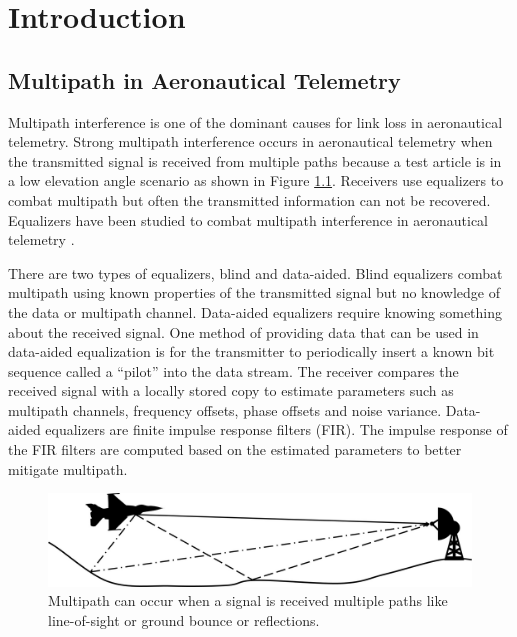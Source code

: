 \chapter{Introduction}
\section{Multipath in Aeronautical Telemetry}
Multipath interference is one of the dominant causes for link loss in aeronautical telemetry.
Strong multipath interference occurs in aeronautical telemetry when the transmitted signal is received from multiple paths because a test article is in a low elevation angle scenario as shown in Figure \ref{fig:multipath}.
Receivers use equalizers to combat multipath but often the transmitted information can not be recovered.
Equalizers have been studied to combat multipath interference in aeronautical telemetry \cite{rice-afran-saquib:2014,rice-afran-saquib-cole-rhodes-moazzami:2014}.

There are two types of equalizers, blind and data-aided.
Blind equalizers combat multipath using known properties of the transmitted signal but no knowledge of the data or multipath channel.
Data-aided equalizers require knowing something about the received signal.
One method of providing data that can be used in data-aided equalization is for the transmitter to periodically insert a known bit sequence called a ``pilot'' into the data stream.
The receiver compares the received signal with a locally stored copy to estimate parameters such as multipath channels, frequency offsets, phase offsets and noise variance.
Data-aided equalizers are finite impulse response filters (FIR). The impulse response of the FIR filters are computed based on the estimated parameters to better mitigate multipath.
\begin{figure}
	\centering\includegraphics[width=12.11in/100*50]{figures/intro/Picture1.jpg}
	\caption{Multipath can occur when a signal is received multiple paths like line-of-sight or ground bounce or reflections.}
	\label{fig:multipath}
\end{figure}

\clearpage
